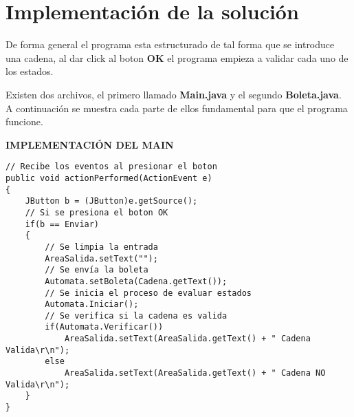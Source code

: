 \documentclass[12pt]{article}
\begin{document}

	\section{Implementación de la solución}

	De forma general el programa esta estructurado de tal forma que se introduce una cadena, 
	al dar click al boton \textbf{OK} el programa empieza a validar cada uno de los estados.

	Existen dos archivos, el primero llamado \textbf{Main.java} y el segundo \textbf{Boleta.java}.\\
	A continuación se muestra cada parte de ellos fundamental para que el programa funcione.

	\textbf{IMPLEMENTACIÓN DEL MAIN}
	\begin{lstlisting}[style=Java]
// Recibe los eventos al presionar el boton 
public void actionPerformed(ActionEvent e)
{
	JButton b = (JButton)e.getSource();
	// Si se presiona el boton OK
	if(b == Enviar)
	{
		// Se limpia la entrada
		AreaSalida.setText("");
		// Se envía la boleta 
		Automata.setBoleta(Cadena.getText());
		// Se inicia el proceso de evaluar estados
		Automata.Iniciar();
		// Se verifica si la cadena es valida
		if(Automata.Verificar())
			AreaSalida.setText(AreaSalida.getText() + " Cadena Valida\r\n");
		else
			AreaSalida.setText(AreaSalida.getText() + " Cadena NO Valida\r\n");
	}
}
	\end{lstlisting}			
\end{document}
